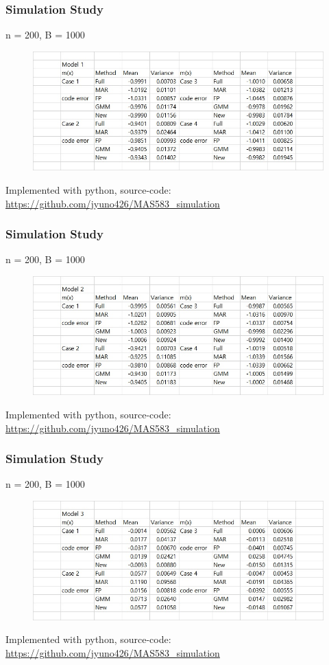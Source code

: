 \documentclass{beamer}
\begin{document}
\begin{frame}
\frametitle{Simulation Study}
\centerline{n = 200, B = 1000}
\begin{figure}
\includegraphics[width=1\linewidth]{res1.jpg}
\end{figure}
\centerline{\tiny{Implemented with python, source-code: \url{https://github.com/jyuno426/MAS583_simulation}}}
\end{frame}
\begin{frame}
\frametitle{Simulation Study}
\centerline{n = 200, B = 1000}
\begin{figure}
\includegraphics[width=1\linewidth]{res2.jpg}
\end{figure}
\centerline{\tiny{Implemented with python, source-code: \url{https://github.com/jyuno426/MAS583_simulation}}}
\end{frame}
\begin{frame}
\frametitle{Simulation Study}
\centerline{n = 200, B = 1000}
\begin{figure}
\includegraphics[width=1\linewidth]{res3.jpg}
\end{figure}
\centerline{\tiny{Implemented with python, source-code: \url{https://github.com/jyuno426/MAS583_simulation}}}
\end{frame}
\end{document}
